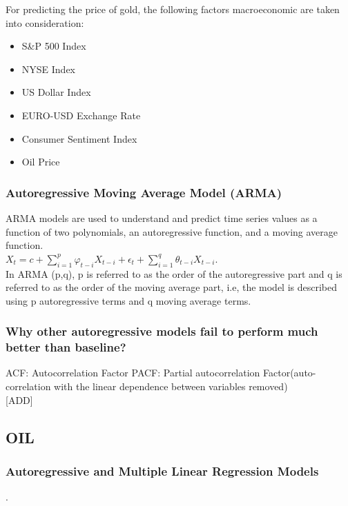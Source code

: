 \documentclass[runningheads]{llncs}
\begin{document}
For predicting the price of gold, the following factors macroeconomic are taken into consideration:
\begin {itemize}
\item S\&P 500 Index
\item NYSE Index
\item US Dollar Index
\item EURO-USD Exchange Rate
\item Consumer Sentiment Index
\item Oil Price
\end {itemize}


\subsubsection{Autoregressive Moving Average Model (ARMA)}
ARMA models are used to understand and predict time series values as a function of two polynomials, an autoregressive function, and a moving average function. 
\\

$ X_{t} = c + \sum\limits_{i=1}^p \varphi_{t-i}X_{t-i} + \epsilon_{t} + \sum\limits_{i=1}^q \theta_{t-i}X_{t-i}$.\\

In ARMA (p,q), p is referred to as the order of the autoregressive part and q is referred to as the order of the moving average part, i.e, the model is described using p autoregressive terms and q moving average terms.\\ 

\subsubsection {Why other autoregressive models fail to perform much better than baseline?}
ACF: Autocorrelation Factor
PACF: Partial autocorrelation Factor(auto-correlation with the linear dependence between variables removed)
\\

[ADD]
\subsection {OIL}

\subsubsection {Autoregressive and Multiple Linear Regression Models}.\\
\end{document}
